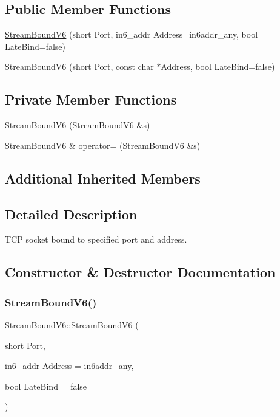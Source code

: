 \subsection*{Public Member Functions}
\begin{DoxyCompactItemize}
\item 
\hyperlink{classStreamBoundV6_a81d2ecafcbb417fe6e319daa8335be18}{Stream\+Bound\+V6} (short Port, in6\+\_\+addr Address=in6addr\+\_\+any, bool Late\+Bind=false)
\item 
\hyperlink{classStreamBoundV6_a2408b1863d8043ea8fc5a2f460e98fb5}{Stream\+Bound\+V6} (short Port, const char $\ast$Address, bool Late\+Bind=false)
\end{DoxyCompactItemize}
\subsection*{Private Member Functions}
\begin{DoxyCompactItemize}
\item 
\hyperlink{classStreamBoundV6_a90747cdecae8ad1ef744cad16e7d9ae1}{Stream\+Bound\+V6} (\hyperlink{classStreamBoundV6}{Stream\+Bound\+V6} \&s)
\item 
\hyperlink{classStreamBoundV6}{Stream\+Bound\+V6} \& \hyperlink{classStreamBoundV6_ad5f53565b680b46896fe8ab713d658f9}{operator=} (\hyperlink{classStreamBoundV6}{Stream\+Bound\+V6} \&s)
\end{DoxyCompactItemize}
\subsection*{Additional Inherited Members}


\subsection{Detailed Description}
T\+CP socket bound to specified port and address. 

\subsection{Constructor \& Destructor Documentation}
\mbox{\label{classStreamBoundV6_a81d2ecafcbb417fe6e319daa8335be18}} 
\subsubsection{\texorpdfstring{Stream\+Bound\+V6()}{StreamBoundV6()}\hspace{0.1cm}{\footnotesize\ttfamily [1/3]}}
{\footnotesize\ttfamily Stream\+Bound\+V6\+::\+Stream\+Bound\+V6 (\begin{DoxyParamCaption}\item[{short}]{Port,  }\item[{in6\+\_\+addr}]{Address = {\ttfamily in6addr\+\_\+any},  }\item[{bool}]{Late\+Bind = {\ttfamily false} }\end{DoxyParamCaption})}

